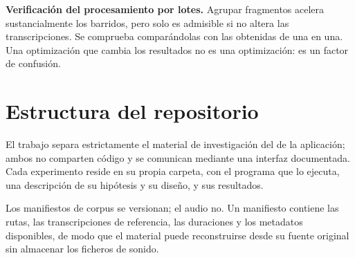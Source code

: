 \textbf{Verificación del procesamiento por lotes.} Agrupar fragmentos acelera
sustancialmente los barridos, pero solo es admisible si no altera las transcripciones. Se
comprueba comparándolas con las obtenidas de una en una. Una optimización que cambia los
resultados no es una optimización: es un factor de confusión.

\section{Estructura del repositorio}

El trabajo separa estrictamente el material de investigación del de la aplicación; ambos
no comparten código y se comunican mediante una interfaz documentada. Cada experimento
reside en su propia carpeta, con el programa que lo ejecuta, una descripción de su
hipótesis y su diseño, y sus resultados.

Los manifiestos de corpus se versionan; el audio no. Un manifiesto contiene las rutas, las
transcripciones de referencia, las duraciones y los metadatos disponibles, de modo que el
material puede reconstruirse desde su fuente original sin almacenar los ficheros de sonido.
